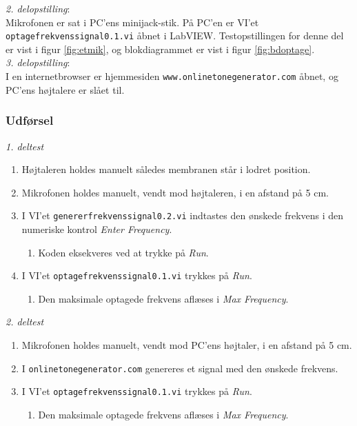 {		\textit{2. delopstilling}:\\
		Mikrofonen er sat i PC'ens minijack-stik. På PC'en er VI'et \texttt{optagefrekvenssignal0.1.vi} åbnet i LabVIEW. Testopstillingen for denne del er vist i figur \ref{fig:etmik}, og blokdiagrammet er vist i figur \ref{fig:bdoptage}.\\  
		
		\textit{3. delopstilling}:\\
		I en internetbrowser er hjemmesiden \texttt{www.onlinetonegenerator.com} åbnet, og PC'ens højtalere er slået til. 
		
		\subsubsection{Udførsel}
			
			\textit{1. deltest}
			\begin{enumerate}
				\item Højtaleren holdes manuelt således membranen står i lodret position. 
				\item Mikrofonen holdes manuelt, vendt mod højtaleren, i en afstand på 5 cm. 
				\item I VI'et \texttt{genererfrekvenssignal0.2.vi} indtastes den ønskede frekvens i den numeriske kontrol \textit{Enter Frequency}. 
					\begin{enumerate}
						\item Koden eksekveres ved at trykke på \textit{Run}. 
					\end{enumerate} 
				\item I VI'et \texttt{optagefrekvenssignal0.1.vi} trykkes på \textit{Run}. 
					\begin{enumerate}
						\item Den maksimale optagede frekvens aflæses i \textit{Max Frequency}. 
					\end{enumerate}	 	
			\end{enumerate}
			
			
			\textit{2. deltest}			
			\begin{enumerate}
				\item Mikrofonen holdes manuelt, vendt mod PC'ens højtaler, i en afstand på 5 cm. 
				\item I \texttt{onlinetonegenerator.com} genereres et signal med den ønskede frekvens. 
				\item I VI'et \texttt{optagefrekvenssignal0.1.vi} trykkes på \textit{Run}. 
					\begin{enumerate}
						\item Den maksimale optagede frekvens aflæses i \textit{Max Frequency}. 
					\end{enumerate}	  
			\end{enumerate}
		
}
